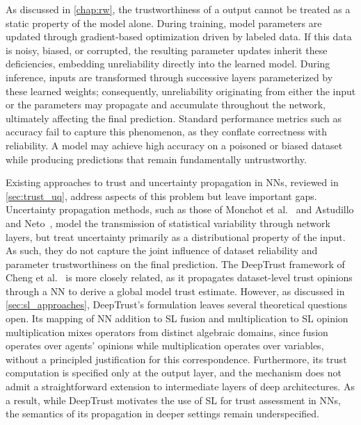 As discussed in \cref{chap:rw}, the trustworthiness of a  output cannot be treated as a static property of the model alone. During training, model parameters are updated through gradient-based optimization driven by labeled data. If this data is noisy, biased, or corrupted, the resulting parameter updates inherit these deficiencies, embedding unreliability directly into the learned model. During inference, inputs are transformed through successive layers parameterized by these learned weights; consequently, unreliability originating from either the input or the parameters may propagate and accumulate throughout the network, ultimately affecting the final prediction. Standard performance metrics such as accuracy fail to capture this phenomenon, as they conflate correctness with reliability. A model may achieve high accuracy on a poisoned or biased dataset while producing predictions that remain fundamentally untrustworthy.

Existing approaches to trust and uncertainty propagation in \acp{NN}, reviewed in \cref{sec:trust_uq}, address aspects of this problem but leave important gaps. Uncertainty propagation methods, such as those of Monchot et al.~\cite{pmlr-v202-monchot23a} and Astudillo and Neto~\cite{astudillo2011propagation}, model the transmission of statistical variability through network layers, but treat uncertainty primarily as a distributional property of the input. As such, they do not capture the joint influence of dataset reliability and parameter trustworthiness on the final prediction. The DeepTrust framework of Cheng et al.~\cite{10.3389/frai.2020.00054} is more closely related, as it propagates dataset-level trust opinions through a \ac{NN} to derive a global model trust estimate. However, as discussed in \cref{sec:sl_approaches}, DeepTrust's formulation leaves several theoretical questions open. Its mapping of \ac{NN} addition to \ac{SL} fusion and multiplication to SL opinion multiplication mixes operators from distinct algebraic domains, since fusion operates over agents' opinions while multiplication operates over variables, without a principled justification for this correspondence. Furthermore, its trust computation is specified only at the output layer, and the mechanism does not admit a straightforward extension to intermediate layers of deep architectures. As a result, while DeepTrust motivates the use of \ac{SL} for trust assessment in \acp{NN}, the semantics of its propagation in deeper settings remain underspecified.

